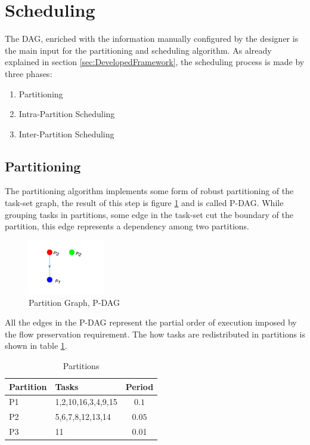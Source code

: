 \section{Scheduling}
The DAG, enriched with the information manually configured by the designer is the main input for the partitioning and scheduling algorithm. As already explained in section \ref{sec:DevelopedFramework}, the scheduling process is made by three phases: \begin{enumerate}
\item Partitioning
\item Intra-Partition Scheduling
\item Inter-Partition Scheduling
\end{enumerate}


\subsection{Partitioning}
The partitioning algorithm implements some form of robust partitioning of the task-set graph, the result of this step is figure \ref{fig:pdag} and is called P-DAG. While grouping tasks in partitions, some edge in the task-set cut the boundary of the partition, this edge represents a dependency among two partitions.
\begin{figure}[htbp] 
\centering    
\includegraphics[width=0.3\textwidth]{PDAG}
\caption{Partition Graph, P-DAG}
\label{fig:pdag}
\end{figure}
All the edges in the P-DAG represent the partial order of execution imposed by the flow preservation requirement. The how tasks are redistributed in partitions is shown in table \ref{tab:partitions}.
\begin{table}
\begin{center}
\begin{tabular}{llc}  
\toprule
Partition & Tasks & Period \\
\midrule
P1  & 1,2,10,16,3,4,9,15 & $0.1$\\
P2  & 5,6,7,8,12,13,14 & $0.05$\\
P3  & 11 & 0.01\\
\bottomrule
\end{tabular}
\caption {Partitions}
\label{tab:partitions}
\end{center}
\end{table}

